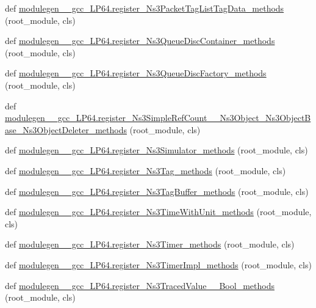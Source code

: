 \begin{DoxyCompactItemize}
\item 
def \hyperlink{namespacemodulegen____gcc__LP64_a5297a25e4d02fb34208dfd16709b500f}{modulegen\+\_\+\+\_\+gcc\+\_\+\+L\+P64.\+register\+\_\+\+Ns3\+Packet\+Tag\+List\+Tag\+Data\+\_\+methods} (root\+\_\+module, cls)
\item 
def \hyperlink{namespacemodulegen____gcc__LP64_ace3cf533674ff1296556725214dbfd01}{modulegen\+\_\+\+\_\+gcc\+\_\+\+L\+P64.\+register\+\_\+\+Ns3\+Queue\+Disc\+Container\+\_\+methods} (root\+\_\+module, cls)
\item 
def \hyperlink{namespacemodulegen____gcc__LP64_a62024c2e88bb7526c876476fc5f61d56}{modulegen\+\_\+\+\_\+gcc\+\_\+\+L\+P64.\+register\+\_\+\+Ns3\+Queue\+Disc\+Factory\+\_\+methods} (root\+\_\+module, cls)
\item 
def \hyperlink{namespacemodulegen____gcc__LP64_a3df0bc75eda374a47e4888b021d60870}{modulegen\+\_\+\+\_\+gcc\+\_\+\+L\+P64.\+register\+\_\+\+Ns3\+Simple\+Ref\+Count\+\_\+\+\_\+\+Ns3\+Object\+\_\+\+Ns3\+Object\+Base\+\_\+\+Ns3\+Object\+Deleter\+\_\+methods} (root\+\_\+module, cls)
\item 
def \hyperlink{namespacemodulegen____gcc__LP64_ac43918825b198877acafaae4cbc1c9e0}{modulegen\+\_\+\+\_\+gcc\+\_\+\+L\+P64.\+register\+\_\+\+Ns3\+Simulator\+\_\+methods} (root\+\_\+module, cls)
\item 
def \hyperlink{namespacemodulegen____gcc__LP64_a8667a8c9dd38f2a77c66b6851250f1cb}{modulegen\+\_\+\+\_\+gcc\+\_\+\+L\+P64.\+register\+\_\+\+Ns3\+Tag\+\_\+methods} (root\+\_\+module, cls)
\item 
def \hyperlink{namespacemodulegen____gcc__LP64_a77191b364d09e6ccbe9b803bee493b0a}{modulegen\+\_\+\+\_\+gcc\+\_\+\+L\+P64.\+register\+\_\+\+Ns3\+Tag\+Buffer\+\_\+methods} (root\+\_\+module, cls)
\item 
def \hyperlink{namespacemodulegen____gcc__LP64_a054aa04457970b1c07a67d49cafee187}{modulegen\+\_\+\+\_\+gcc\+\_\+\+L\+P64.\+register\+\_\+\+Ns3\+Time\+With\+Unit\+\_\+methods} (root\+\_\+module, cls)
\item 
def \hyperlink{namespacemodulegen____gcc__LP64_abaaa5d79bd79fea81e9f20a9367be87f}{modulegen\+\_\+\+\_\+gcc\+\_\+\+L\+P64.\+register\+\_\+\+Ns3\+Timer\+\_\+methods} (root\+\_\+module, cls)
\item 
def \hyperlink{namespacemodulegen____gcc__LP64_a74c48210cfd83167b1a36fb5d55d1814}{modulegen\+\_\+\+\_\+gcc\+\_\+\+L\+P64.\+register\+\_\+\+Ns3\+Timer\+Impl\+\_\+methods} (root\+\_\+module, cls)
\item 
def \hyperlink{namespacemodulegen____gcc__LP64_a8e4c0213d4ab1508e227fe841110a501}{modulegen\+\_\+\+\_\+gcc\+\_\+\+L\+P64.\+register\+\_\+\+Ns3\+Traced\+Value\+\_\+\+\_\+\+Bool\+\_\+methods} (root\+\_\+module, cls)

\end{DoxyCompactItemize}
